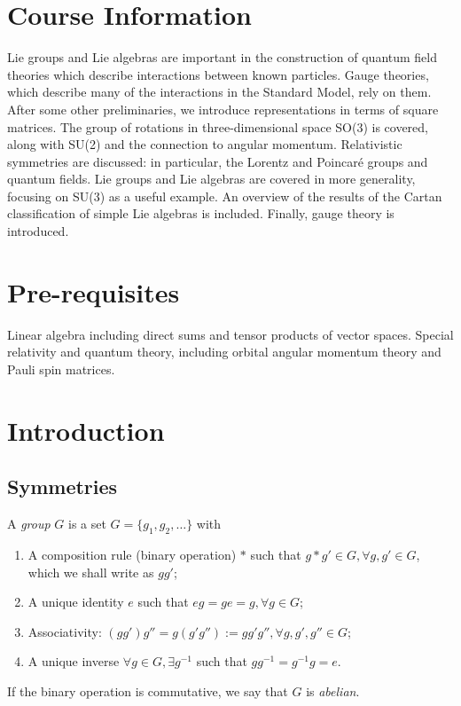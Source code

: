 \documentclass[a4paper,11pt]{article}
\begin{document}
	\maketitlepage
	\preliminaries

	\section*{Course Information}

	Lie groups and Lie algebras are important in the construction of quantum field theories which describe interactions between known particles. Gauge theories, which describe many of the interactions in the Standard Model, rely on them. After some other preliminaries, we introduce representations in terms of square matrices. The group of rotations in three-dimensional space SO(3) is covered, along with SU(2) and the connection to angular momentum. Relativistic symmetries are discussed: in particular, the Lorentz and Poincar\'e groups and quantum fields. Lie groups and Lie algebras are covered in more generality, focusing on SU(3) as a useful example. An overview of the results of the Cartan classification of simple Lie algebras is included. Finally, gauge theory is introduced.
	
	\section*{Pre-requisites}

	Linear algebra including direct sums and tensor products of vector spaces. Special relativity and quantum theory, including orbital angular momentum theory and Pauli spin matrices.
  
	\newpage
	\tableofcontents
	\newpage
	\maintext
	\setcounter{section}{-1}
	\section{Introduction}
	\subsection{Symmetries} 
	\begin{defi}
		A \emph{group} $G$ is a set $G = \{g_1, g_2, \dots\}$ with
		\begin{enumerate}
			\item A composition rule (binary operation) $*$ such that $g * g' \in G, \forall g,g' \in G$, which we shall write as $gg'$;
			\item A unique identity $e$ such that $eg=ge=g, \forall g \in G$;
			\item Associativity: $(gg')g'' = g (g'g'') := gg'g'', \forall g,g',g''\in G$;
			\item A unique inverse $\forall g\in G, \exists g^{-1}$ such that $g g^{-1} = g^{-1} g = e$.
		\end{enumerate}

		If the binary operation is commutative, we say that $G$ is \emph{abelian}.
	\end{defi}
\end{document}
